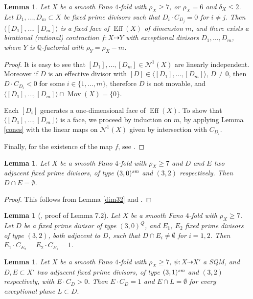 \documentclass[a4paper,12pt]{amsart}
\newtheorem{lemma}[thm]{Lemma}
\theoremstyle{definition}
\numberwithin{figure}{section}
\numberwithin{table}{section}
\newcommand{\Q}{\mathbb{Q}}
\newcommand{\Nu}{\mathcal{N}^1}
\newcommand{\Eff}{\operatorname{Eff}}
\newcommand{\Mov}{\operatorname{Mov}}
\newcommand{\sm}{\text{\it sm}}
\begin{document}
\begin{lemma}\label{linate}
Let $X$ be a smooth Fano $4$-fold with $\rho_X\geq 7$, or $\rho_X=6$ and $\delta_X\leq 2$. Let $D_1,\dotsc,D_m\subset X$ be
fixed prime divisors such that $D_i\cdot C_{D_j}=0$ for $i\neq j$. Then $\langle [D_1],\dotsc,[D_m]\rangle$ is a fixed face of $\Eff(X)$ of dimension $m$, and there exists a birational (rational) contraction $f\colon X\dasharrow Y$ with exceptional divisors $D_1,\dotsc,D_m$, where $Y$ is $\Q$-factorial with $\rho_Y=\rho_X-m$.
\end{lemma}
\begin{proof}
  It is easy to see that $[D_1],\dotsc,[D_m]\in\Nu(X)$ are linearly independent. Moreover if $D$ is an effective  divisor with $[D]\in\langle [D_1],\dotsc,[D_m]\rangle$, $D\neq 0$, then $D\cdot C_{D_i}<0$ for some $i\in\{1,\dotsc,m\}$, therefore $D$ is not movable, and $\langle [D_1],\dotsc,[D_m]\rangle\cap\Mov(X)=\{0\}$.

  Each $[D_i]$ generates a one-dimensional face of $\Eff(X)$.
  To show that $\langle [D_1],\dotsc,[D_m]\rangle$ is a face, we proceed by induction on $m$, by applying Lemma \ref{cones} with the linear maps on $\Nu(X)$ given by intersection with $C_{D_i}$.

  Finally, for the existence of the map $f$, see \cite[Lemma 4.2 and its proof]{small}.
\end{proof}  
\begin{lemma}\label{30sm}
  Let $X$ be a smooth Fano $4$-fold with $\rho_X\geq 7$ and $D$ and $E$ two adjacent fixed prime divisors, 
 of type $(3,0)^{\sm}$ and $(3,2)$ respectively. Then $D\cap E=\emptyset$.
\end{lemma}
\begin{proof}
  This follows from Lemma \ref{dim32} and \cite[Lemma 4.9]{fibrations}.
\end{proof}
\begin{lemma}[\cite{small}, proof of Lemma 7.2]\label{30Q}
Let $X$ be a smooth Fano $4$-fold with $\rho_X\geq 7$. Let $D$ be a fixed prime divisor of type $(3,0)^{Q}$, and $E_1$, $E_2$ fixed prime divisors of type $(3,2)$, both adjacent to $D$, such that $D\cap E_i\neq\emptyset$ for $i=1,2$. Then $E_1\cdot C_{E_2}=E_2\cdot C_{E_1}=1$.
\end{lemma}
\begin{lemma}\label{disjoint}
  Let $X$ be a smooth Fano $4$-fold with $\rho_X\geq 7$, $\psi\colon X\dasharrow X'$ a SQM,
  and $D,E\subset X'$ two adjacent fixed prime divisors, of type $(3,1)^{\sm}$ and $(3,2)$ respectively, with $E\cdot C_D>0$.
Then $E\cdot C_D=1$ and $E \cap L=\emptyset$ for every  exceptional plane $L\subset D$.
\end{lemma}
\end{document}
